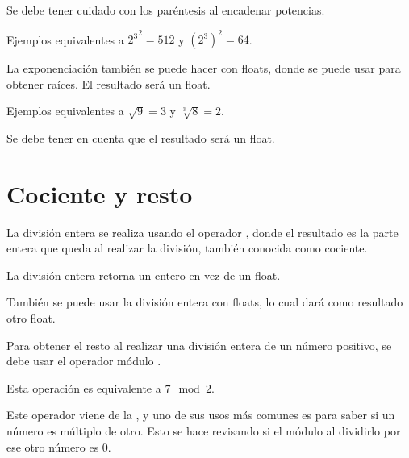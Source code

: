 
Se debe tener cuidado con los paréntesis al encadenar potencias.

Ejemplos equivalentes a ${2 ^ 3} ^ 2 = 512$ y $(2 ^ 3) ^ 2 = 64$.


La exponenciación también se puede hacer con floats, donde se puede usar para obtener raíces.
El resultado será un float.


Ejemplos equivalentes a $\sqrt{9} = 3$ y $\sqrt[3]{8} = 2$.


Se debe tener en cuenta que el resultado será un float.

\section{Cociente y resto}

La división entera se realiza usando el operador \ttt{//}, donde el resultado es la parte entera que queda al realizar la división, también conocida como cociente.


La división entera retorna un entero en vez de un float.


También se puede usar la división entera con floats, lo cual dará como resultado otro float.


Para obtener el resto al realizar una división entera de un número positivo, se debe usar el operador módulo \ttt{\%}.


Esta operación es equivalente a $7 \mod{2}$.

Este operador viene de la , y uno de sus usos más comunes es para saber si un número es múltiplo de otro.
Esto se hace revisando si el módulo al dividirlo por ese otro número es 0.

